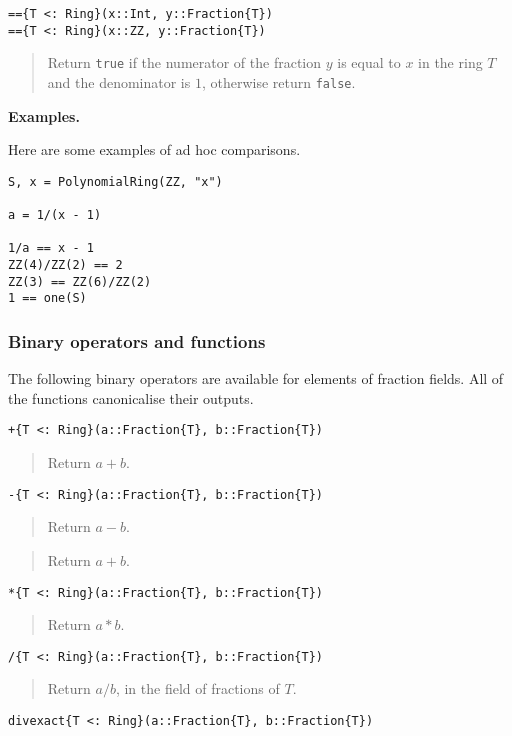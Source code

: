 \documentclass[a4paper,10pt]{article}
\newcommand{\code}{\lstinline}
\newcommand{\desc}[1]{\vspace{-3mm}\begin{quote}#1\end{quote}}
\begin{document}
{{{\begin{lstlisting}
=={T <: Ring}(x::Int, y::Fraction{T})
=={T <: Ring}(x::ZZ, y::Fraction{T})
\end{lstlisting}

\desc{Return \code{true} if the numerator of the fraction $y$ is equal to $x$
in the ring $T$ and the denominator is $1$, otherwise return \code{false}.}

\textbf{Examples.}

Here are some examples of ad hoc comparisons.

\begin{lstlisting}
S, x = PolynomialRing(ZZ, "x")

a = 1/(x - 1)

1/a == x - 1
ZZ(4)/ZZ(2) == 2
ZZ(3) == ZZ(6)/ZZ(2)
1 == one(S)
\end{lstlisting}

\subsubsection{Binary operators and functions}

The following binary operators are available for elements of fraction fields.
All of the functions canonicalise their outputs.

\begin{lstlisting}
+{T <: Ring}(a::Fraction{T}, b::Fraction{T})
\end{lstlisting}

\desc{Return $a + b$.}

\begin{lstlisting}
-{T <: Ring}(a::Fraction{T}, b::Fraction{T})
\end{lstlisting}

\desc{Return $a - b$.}

\desc{Return $a + b$.}

\begin{lstlisting}
*{T <: Ring}(a::Fraction{T}, b::Fraction{T})
\end{lstlisting}

\desc{Return $a*b$.}

\begin{lstlisting}
/{T <: Ring}(a::Fraction{T}, b::Fraction{T})
\end{lstlisting}

\desc{Return $a/b$, in the field of fractions of $T$.}

\begin{lstlisting}
divexact{T <: Ring}(a::Fraction{T}, b::Fraction{T})
\end{lstlisting}

}}}
\end{document}
